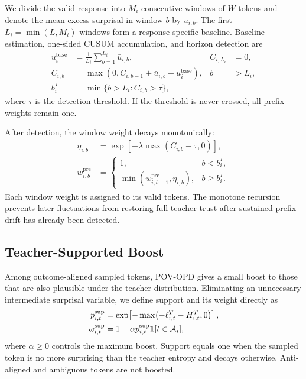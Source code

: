 We divide the valid response into $M_i$ consecutive windows of $W$ tokens and denote the mean excess surprisal in window $b$ by $\bar u_{i,b}$. The first $L_i=\min(L,M_i)$ windows form a response-specific baseline. Baseline estimation, one-sided CUSUM accumulation, and horizon detection are
\begin{equation}
\begin{aligned}
u_i^{\mathrm{base}}&=\frac{1}{L_i}\sum_{b=1}^{L_i}\bar u_{i,b},
&C_{i,L_i}&=0,\\
C_{i,b}&=\max\!\left(0,C_{i,b-1}+\bar u_{i,b}-u_i^{\mathrm{base}}\right),
&b&>L_i,\\
b_i^\star&=\min\{b>L_i:C_{i,b}>\tau\},
\end{aligned}
\label{eq:prefix-detection}
\end{equation}
where $\tau$ is the detection threshold. If the threshold is never crossed, all prefix weights remain one.

After detection, the window weight decays monotonically:
\begin{equation}
\begin{aligned}
\eta_{i,b}&=\exp[-\lambda\max(C_{i,b}-\tau,0)],\\
w^{\mathrm{pre}}_{i,b}&=
\begin{cases}
1, & b<b_i^\star,\\
\min(w^{\mathrm{pre}}_{i,b-1},\eta_{i,b}), & b\geq b_i^\star.
\end{cases}
\end{aligned}
\label{eq:prefix-validation}
\end{equation}
Each window weight is assigned to its valid tokens. The monotone recursion prevents later fluctuations from restoring full teacher trust after sustained prefix drift has already been detected.

\subsection{Teacher-Supported Boost}

Among outcome-aligned sampled tokens, POV-OPD gives a small boost to those that are also plausible under the teacher distribution. Eliminating an unnecessary intermediate surprisal variable, we define support and its weight directly as
\begin{equation}
\begin{aligned}
p^{\mathrm{sup}}_{i,t}
&=\exp\!\left[-\max\!\left(-\ell^T_{i,t}-H^T_{i,t},0\right)\right],\\
w^{\mathrm{sup}}_{i,t}
&=1+\alpha p^{\mathrm{sup}}_{i,t}{\bf 1}[t\in{\cal A}_i],
\end{aligned}
\label{eq:teacher-support}
\end{equation}
where $\alpha\geq0$ controls the maximum boost. Support equals one when the sampled token is no more surprising than the teacher entropy and decays otherwise. Anti-aligned and ambiguous tokens are not boosted.

